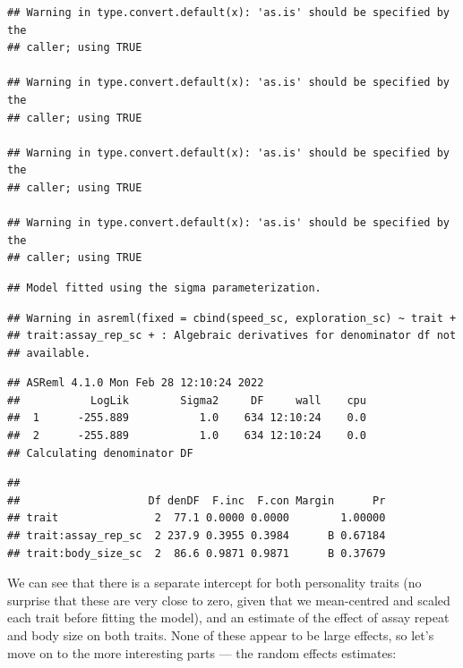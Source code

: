 \documentclass[
  12pt,
]{book}
\newenvironment{Shaded}{\begin{snugshade}}{\end{snugshade}}
\newcommand{\KeywordTok}[1]{\textcolor[rgb]{0.13,0.29,0.53}{\textbf{#1}}}
\newcommand{\NormalTok}[1]{#1}
\newcommand{\OperatorTok}[1]{\textcolor[rgb]{0.81,0.36,0.00}{\textbf{#1}}}
\begin{document}
\begin{verbatim}
## Warning in type.convert.default(x): 'as.is' should be specified by the
## caller; using TRUE

## Warning in type.convert.default(x): 'as.is' should be specified by the
## caller; using TRUE

## Warning in type.convert.default(x): 'as.is' should be specified by the
## caller; using TRUE

## Warning in type.convert.default(x): 'as.is' should be specified by the
## caller; using TRUE
\end{verbatim}

\begin{verbatim}
## Model fitted using the sigma parameterization.
\end{verbatim}

\begin{verbatim}
## Warning in asreml(fixed = cbind(speed_sc, exploration_sc) ~ trait +
## trait:assay_rep_sc + : Algebraic derivatives for denominator df not
## available.
\end{verbatim}

\begin{verbatim}
## ASReml 4.1.0 Mon Feb 28 12:10:24 2022
##           LogLik        Sigma2     DF     wall    cpu
##  1      -255.889           1.0    634 12:10:24    0.0
##  2      -255.889           1.0    634 12:10:24    0.0
## Calculating denominator DF
\end{verbatim}

\begin{verbatim}
## 
##                    Df denDF  F.inc  F.con Margin      Pr
## trait               2  77.1 0.0000 0.0000        1.00000
## trait:assay_rep_sc  2 237.9 0.3955 0.3984      B 0.67184
## trait:body_size_sc  2  86.6 0.9871 0.9871      B 0.37679
\end{verbatim}

We can see that there is a separate intercept for both personality traits (no surprise that these are very close to zero, given that we mean-centred and scaled each trait before fitting the model), and an estimate of the effect of assay repeat and body size on both traits. None of these appear to be large effects, so let's move on to the more interesting parts --- the random effects estimates:

\begin{Shaded}
\end{Shaded}
\end{document}
